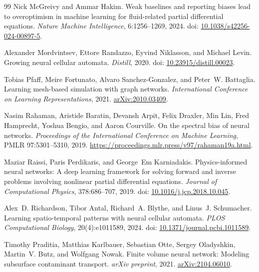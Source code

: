 \begin{thebibliography}{99}
Nick McGreivy and Ammar Hakim.
Weak baselines and reporting biases lead to overoptimism in machine learning for
fluid-related partial differential equations.
\emph{Nature Machine Intelligence}, 6:1256--1269, 2024.
doi: \href{https://doi.org/10.1038/s42256-024-00897-5}{10.1038/s42256-024-00897-5}.

Alexander Mordvintsev, Ettore Randazzo, Eyvind Niklasson, and Michael Levin.
Growing neural cellular automata.
\emph{Distill}, 2020. doi: \href{https://doi.org/10.23915/distill.00023}{10.23915/distill.00023}.

Tobias Pfaff, Meire Fortunato, Alvaro Sanchez-Gonzalez, and Peter~W. Battaglia.
Learning mesh-based simulation with graph networks.
\emph{International Conference on Learning Representations}, 2021.
\href{https://arxiv.org/abs/2010.03409}{arXiv:2010.03409}.

Nasim Rahaman, Aristide Baratin, Devansh Arpit, Felix Draxler, Min Lin,
Fred Hamprecht, Yoshua Bengio, and Aaron Courville.
On the spectral bias of neural networks.
\emph{Proceedings of the International Conference on Machine Learning},
PMLR 97:5301--5310, 2019.
\url{https://proceedings.mlr.press/v97/rahaman19a.html}.

Maziar Raissi, Paris Perdikaris, and George~Em Karniadakis.
Physics-informed neural networks: A deep learning framework for solving forward
and inverse problems involving nonlinear partial differential equations.
\emph{Journal of Computational Physics}, 378:686--707, 2019.
doi: \href{https://doi.org/10.1016/j.jcp.2018.10.045}{10.1016/j.jcp.2018.10.045}.

Alex~D. Richardson, Tibor Antal, Richard~A. Blythe, and Linus~J. Schumacher.
Learning spatio-temporal patterns with neural cellular automata.
\emph{PLOS Computational Biology}, 20(4):e1011589, 2024.
doi: \href{https://doi.org/10.1371/journal.pcbi.1011589}{10.1371/journal.pcbi.1011589}.

Timothy Praditia, Matthias Karlbauer, Sebastian Otte, Sergey Oladyshkin, Martin~V. Butz, and Wolfgang Nowak.
Finite volume neural network: Modeling subsurface contaminant transport.
\emph{arXiv preprint}, 2021. \href{https://arxiv.org/abs/2104.06010}{arXiv:2104.06010}.


\end{thebibliography}
